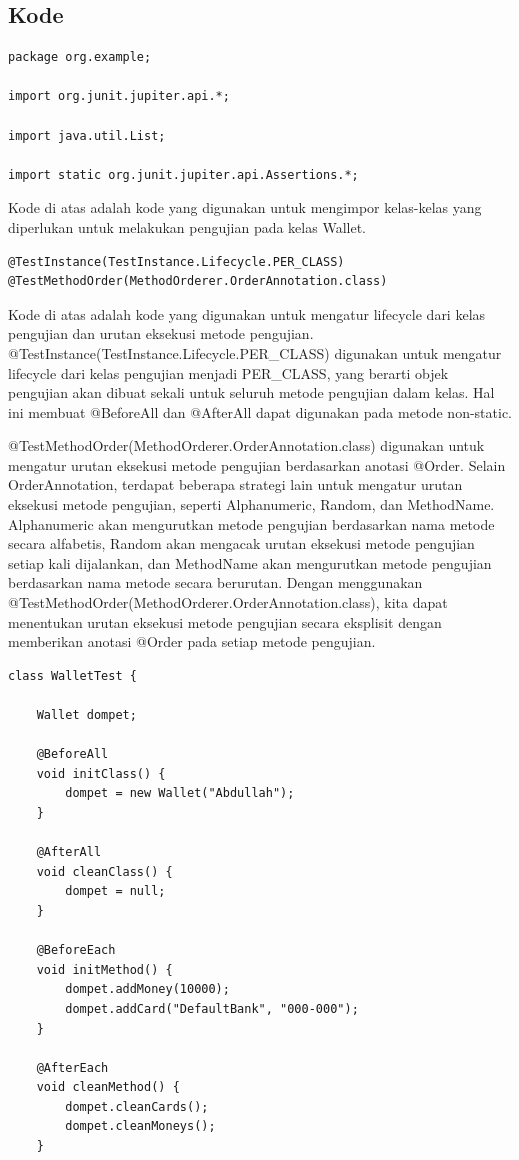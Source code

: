 \documentclass[a4paper,12pt]{article}
\begin{document}
\subsection{Kode}
\begin{lstlisting}[style=javastyle]
package org.example;

import org.junit.jupiter.api.*;

import java.util.List;

import static org.junit.jupiter.api.Assertions.*;
\end{lstlisting}

Kode di atas adalah kode yang digunakan untuk mengimpor kelas-kelas yang diperlukan untuk melakukan pengujian pada kelas Wallet.

\begin{lstlisting}[style=javastyle]
@TestInstance(TestInstance.Lifecycle.PER_CLASS)
@TestMethodOrder(MethodOrderer.OrderAnnotation.class)
\end{lstlisting}

Kode di atas adalah kode yang digunakan untuk mengatur lifecycle dari kelas pengujian dan urutan eksekusi metode pengujian. @TestInstance(TestInstance.Lifecycle.PER\_CLASS) digunakan untuk mengatur lifecycle dari kelas pengujian menjadi PER\_CLASS, yang berarti objek pengujian akan dibuat sekali untuk seluruh metode pengujian dalam kelas. Hal ini membuat @BeforeAll dan @AfterAll dapat digunakan pada metode non-static.

@TestMethodOrder(MethodOrderer.OrderAnnotation.class) digunakan untuk mengatur urutan eksekusi metode pengujian berdasarkan anotasi @Order. Selain OrderAnnotation, terdapat beberapa strategi lain untuk mengatur urutan eksekusi metode pengujian, seperti Alphanumeric, Random, dan MethodName. Alphanumeric akan mengurutkan metode pengujian berdasarkan nama metode secara alfabetis, Random akan mengacak urutan eksekusi metode pengujian setiap kali dijalankan, dan MethodName akan mengurutkan metode pengujian berdasarkan nama metode secara berurutan. Dengan menggunakan @TestMethodOrder(MethodOrderer.OrderAnnotation.class), kita dapat menentukan urutan eksekusi metode pengujian secara eksplisit dengan memberikan anotasi @Order pada setiap metode pengujian.

\begin{lstlisting}[style=javastyle]
class WalletTest {

    Wallet dompet;

    @BeforeAll
    void initClass() {
        dompet = new Wallet("Abdullah");
    }

    @AfterAll
    void cleanClass() {
        dompet = null;
    }

    @BeforeEach
    void initMethod() {
        dompet.addMoney(10000);
        dompet.addCard("DefaultBank", "000-000");
    }

    @AfterEach
    void cleanMethod() {
        dompet.cleanCards();
        dompet.cleanMoneys();
    }
\end{lstlisting}
\end{document}
